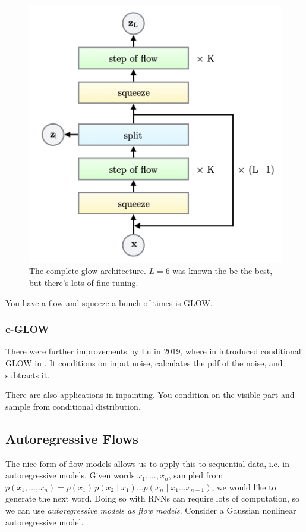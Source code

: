 \documentclass{article}
\begin{document}
  \begin{figure}[H]
    \centering 
    \includegraphics[scale=0.4]{img/glow_architecture.png}
    \caption{The complete glow architecture. $L = 6$ was known the be the best, but there's lots of fine-tuning. } 
    \label{fig:glow_architecture}
  \end{figure}

  You have a flow and squeeze a bunch of times is GLOW. 

  \subsubsection{c-GLOW} 
  
    There were further improvements by Lu in 2019, where in introduced conditional GLOW in \cite{cglow}. It conditions on input noise, calculates the pdf of the noise, and subtracts it. 

    There are also applications in inpainting. You condition on the visible part and sample from conditional distribution. 


\subsection{Autoregressive Flows} 

  The nice form of flow models allows us to apply this to sequential data, i.e. in autoregressive models. Given words $x_1, \ldots, x_n$, sampled from $p(x_1, \ldots, x_n) = p(x_1) \, p(x_2 \mid x_1) \ldots p(x_n \mid x_1 \ldots x_{n-1})$, we would like to generate the next word. Doing so with RNNs can require lots of computation, so we can use \textit{autoregressive models as flow models}. Consider a Gaussian nonlinear autoregressive model. 
\end{document}
